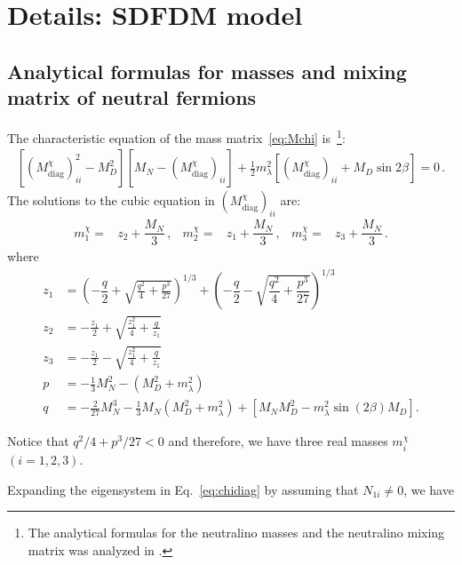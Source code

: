 \chapter{Details: SDFDM  model}

\section{Analytical formulas for masses and mixing matrix of neutral fermions}
\label{sec:analyt-form-mass}
%
The characteristic equation of the mass matrix~\eqref{eq:Mchi}
is~\cite{Cheung:2013dua}\footnote{The analytical formulas for the neutralino
  masses and the neutralino mixing matrix was
  analyzed in \cite{ElKheishen:1992yv}.}:
\begin{align}
\left[\left({M}^{\chi}_{\text{diag}}\right)_{ii}^2-M_D^2\right]
\left[M_N-\left({M}^{\chi}_{\text{diag}}\right)_{ii}^{\phantom{2}}
\right]
+\tfrac{1}{2}m_{\lambda}^2\left[\left({M}^{\chi}_{\text{diag}}\right)_{ii}+M_D\sin 2\beta
\right]=0\,.
\label{eq:characteristic-equation}
\end{align}
The solutions to the cubic equation in  $\left({M}^{\chi}_{\text{diag}}\right)_{ii}$ are:
\begin{align}
m_1^\chi=&z_2+\dfrac{M_N}{3}\,,&
m_2^\chi=&z_1+\dfrac{M_N}{3}\,, &
m_3^\chi=&z_3+\dfrac{M_N}{3}\,.
\end{align}
where
\begin{align}
z_1&=\left(-\dfrac{q}{2}+\sqrt{\frac{q^2}{4}+\frac{p^3}{27}}\right)^{1/3} + \left(-\dfrac{q}{2}-\sqrt{\dfrac{q^2}{4}+\dfrac{p^3}{27}}\right)^{1/3}\nonumber\\ 
z_2&=-\frac{z_1}{2}+\sqrt{\frac{z_1^2}{4}+\frac{q}{z_1}} \nonumber\\ 
z_3&=-\frac{z_1}{2}-\sqrt{\frac{z_1^2}{4}+\frac{q}{z_1}}\nonumber\\ 
p&=-\frac{1}{3}M_N^2-\left(M_D^2+m_{\lambda}^2\right)  \nonumber\\ 
q&=-\frac{2}{27}M_N^3-\frac{1}{3}M_N\left(M_D^2+m_{\lambda}^2\right)+\left[M_NM_D^2-m_{\lambda}^2\sin(2\beta) M_D\right].
\end{align}

Notice that ${q^2}/{4}+{p^3}/{27} < 0$ and therefore, we have three real masses $m_i^\chi$ $(i=1,2,3)$.

Expanding the eigensystem in Eq.~\eqref{eq:chidiag} by  assuming  that ${N}_{1i}\neq 0$, we have 

